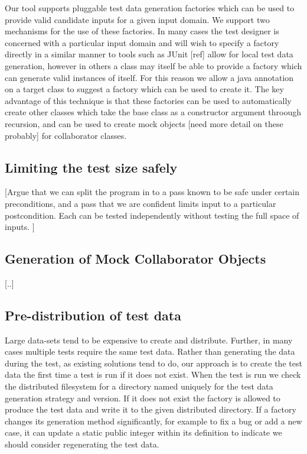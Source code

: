 \documentclass[10pt,journal,cspaper,compsoc]{IEEEtran}
\begin{document}
Our tool supports pluggable test data generation factories which can be used to provide valid candidate inputs for a given input domain. We support two mechanisms for the use of these factories. In many cases the test designer is concerned with a particular input domain and will wish to specify a factory directly in a similar manner to tools such as JUnit [ref] allow for local test data generation, however in others a class may itself be able to provide a factory which can generate valid instances of itself. For this reason we allow a java annotation on a target class to suggest a factory which can be used to create it. The key advantage of this technique is that these factories can be used to automatically create other classes which take the base class as a constructor argument throough recursion, and can be used to create mock objects [need more detail on these probably] for collaborator classes.

\subsection{Limiting the test size safely}

[Argue that we can split the program in to a pass known to be safe under certain preconditions, and a pass that we are confident limits input to a particular postcondition. Each can be tested independently without testing the full space of inputs. ]

\subsection{Generation of Mock Collaborator Objects}

[..]

\subsection{Pre-distribution of test data}

Large data-sets tend to be expensive to create and distribute. Further, in many cases multiple tests require the same test data. Rather than generating the data during the test, as existing solutions tend to do, our approach is to create the test data the first time a test is run if it does not exist. When the test is run we check the distributed filesystem for a directory named uniquely for the test data generation strategy and version. If it does not exist the factory is allowed to produce the test data and write it to the given distributed directory. If a factory changes its generation method significantly, for example to fix a bug or add a new case, it can update a static public integer within its definition to indicate we should consider regenerating the test data.
\end{document}
